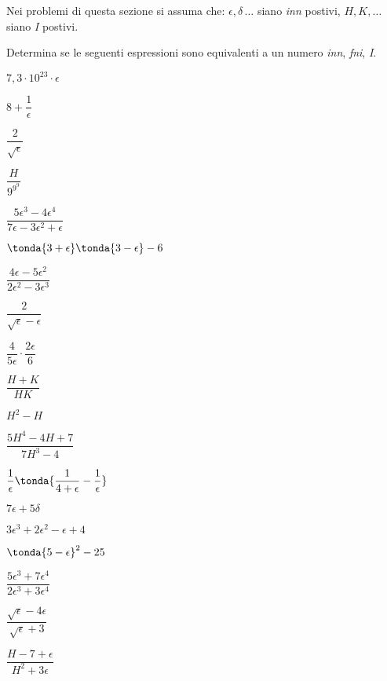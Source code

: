 \subsubsection*{}

Nei problemi di questa sezione si assuma che: 
\(\epsilon, \delta\, \dots\) siano \emph{inn} postivi, 
\(H, K, \dots\) siano \emph{I} postivi.

\begin{esercizio}\label{ese:iper_op_01}
Determina se le seguenti espressioni sono equivalenti a un numero 
\emph{inn}, \emph{fni}, \emph{I}.
\begin{multicols}{3}
\begin{enumeratea}
 \item \(7,3 \cdot 10^{23} \cdot \epsilon\)
 \item \(8 +\dfrac{1}{\epsilon}\)
 \item \(\dfrac{2}{\sqrt{\epsilon}}\) 
 \item \(\dfrac{H}{9^{9^9}}\) 
 \item \(\dfrac{5 \epsilon^3 -4 \epsilon^4}
               {7 \epsilon -3 \epsilon^2 +\epsilon}\)
 \item \(\tonda{3 +\epsilon} \tonda{3 -\epsilon} -6\) 
 \item \(\dfrac{4 \epsilon - 5 \epsilon^2}{2 \epsilon^2 -3 \epsilon^3}\) 
 \item \(\dfrac{2}{\sqrt{\epsilon} - \epsilon}\) 
 \item \(\dfrac{4}{5 \epsilon} \cdot \dfrac{2 \epsilon}{6}\) 
 \item \(\dfrac{H + K}{HK}\) 
 \item \(H^2 - H\)  
 \item \(\dfrac{5 H^4 -4 H +7} {7 H^3 -4}\)
 \item \(\dfrac{1}{\epsilon} \tonda{\dfrac{1} {4 + \epsilon} -
                                    \dfrac{1}{\epsilon}}\)
 \item \(7 \epsilon + 5 \delta\)
 \item \(3 \epsilon^3 +2 \epsilon^2 - \epsilon +4\)
 \item \(\tonda{5 - \epsilon}^2 - 25\)
 \item \(\dfrac{5 \epsilon^3 + 7  \epsilon^4}{2 \epsilon^3 + 3  
\epsilon^4}\)
 \item \(\dfrac{\sqrt{\epsilon} -4 \epsilon}{\sqrt{\epsilon} + 3}\)
 \item \(\dfrac{H -7 +\epsilon}{H^2 + 3 \epsilon}\)
\end{enumeratea}
\end{multicols}
\end{esercizio}

